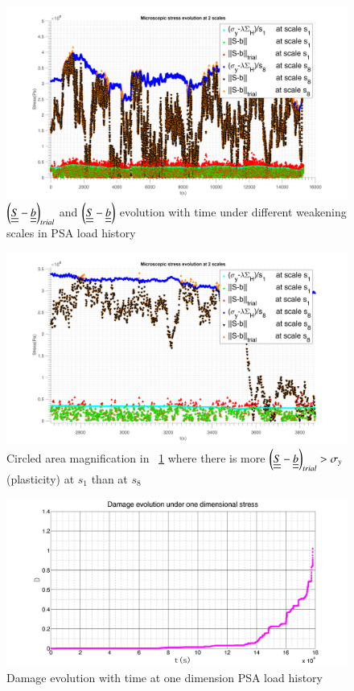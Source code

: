 \documentclass[3p,times,procedia,number]{elsarticle}
\newcommand{\figref}[1]{\figurename~\ref{#1}}
\begin{document}
\begin{figure}[!h]
	\centering
	\includegraphics[width=\textwidth]{figures//trialreal1d1.png} 
	\caption{$\left( \uline{\uline{S}}-\uline{\uline{b}}\right)_{trial}$ and $\left( \uline{\uline{S}}-\uline{\uline{b}}\right)$ evolution with time under different weakening scales in PSA load history}
	\label{trialreal}
\end{figure}
\begin{figure}[!h]
	\centering
	\includegraphics[width=\textwidth]{figures//trialreal1d2.png} 
	\caption{Circled area magnification in \figref{trialreal} where there is more $\left( \uline{\uline{S}}-\uline{\uline{b}}\right)_{trial}>\sigma_y$(plasticity)  at $s_1$ than at $s_8$}
	\label{trialreal1d2}
\end{figure}
\begin{figure}[!h]
	\centering
	\includegraphics[width=\textwidth]{figures//damage1d.png} 
	\caption{Damage evolution with time at one dimension PSA load history}
	\label{damage1d}
\end{figure}
\end{document}
